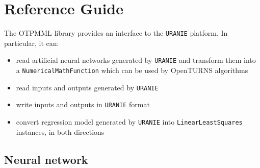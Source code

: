 % 




\section{Reference Guide}

The OTPMML library provides an interface to the \texttt{URANIE} platform.  In particular, it can:
\begin{itemize}
\item read artificial neural networks generated by \texttt{URANIE} and transform them into a \texttt{NumericalMathFunction} which can be used by OpenTURNS algorithms
\item read inputs and outputs generated by \texttt{URANIE}
\item write inputs and outputs in \texttt{URANIE} format
\item convert regression model generated by \texttt{URANIE} into \texttt{LinearLeastSquares} instances, in both directions
\end{itemize}

\subsection{Neural network}

